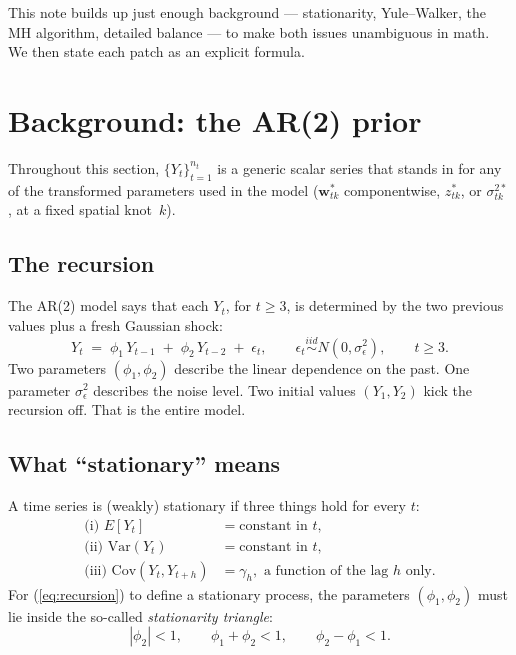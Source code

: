 \documentclass[11pt]{article}
\newcommand{\bw}{\mathbf{w}}
\newcommand{\eref}[1]{(\ref{#1})}
\theoremstyle{plain}
\theoremstyle{definition}
\theoremstyle{remark}
\begin{document}
This note builds up just enough background --- stationarity, Yule--Walker,
the MH algorithm, detailed balance --- to make both issues unambiguous in
math. We then state each patch as an explicit formula.

\section{Background: the AR(2) prior}\label{sec:bg}

Throughout this section, $\{Y_t\}_{t=1}^{n_t}$ is a generic scalar series
that stands in for any of the transformed parameters used in the model
($\bw^{*}_{tk}$ componentwise, $z^{*}_{tk}$, or $\sigma^{2*}_{tk}$, at a
fixed spatial knot~$k$).

\subsection{The recursion}\label{sec:recursion}

The AR(2) model says that each $Y_t$, for $t \geq 3$, is determined by
the two previous values plus a fresh Gaussian shock:
\begin{equation}\label{eq:recursion}
  Y_t \;=\; \phi_1\, Y_{t-1} \;+\; \phi_2\, Y_{t-2} \;+\; \epsilon_t,
  \qquad
  \epsilon_t \stackrel{iid}{\sim} N(0, \sigma_\epsilon^2),
  \qquad t \geq 3.
\end{equation}
Two parameters $(\phi_1, \phi_2)$ describe the linear dependence on the
past. One parameter $\sigma_\epsilon^2$ describes the noise level. Two
initial values $(Y_1, Y_2)$ kick the recursion off. That is the entire
model.

\subsection{What ``stationary'' means}\label{sec:stationary}

A time series is (weakly) stationary if three things hold for every $t$:
\begin{align*}
  \text{(i) } E[Y_t] &= \text{constant in } t, \\
  \text{(ii) } \mathrm{Var}(Y_t) &= \text{constant in } t, \\
  \text{(iii) } \mathrm{Cov}(Y_t, Y_{t+h}) &= \gamma_h,
        \text{ a function of the lag } h \text{ only}.
\end{align*}
For \eref{eq:recursion} to define a stationary process, the parameters
$(\phi_1, \phi_2)$ must lie inside the so-called \emph{stationarity
triangle}:
\begin{equation}\label{eq:stab}
  |\phi_2| < 1, \qquad \phi_1 + \phi_2 < 1, \qquad \phi_2 - \phi_1 < 1.
\end{equation}
\end{document}
